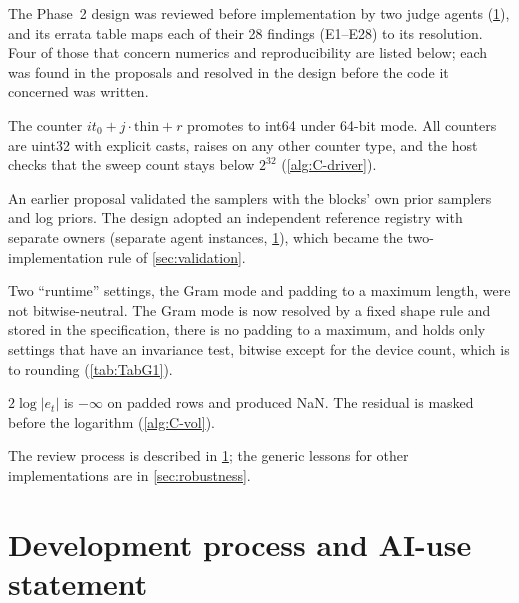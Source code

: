 The Phase~2 design was reviewed before implementation by two judge agents (\cref{app:process}),
and its errata table maps each of their 28 findings (E1--E28) to its resolution.
Four of those that concern numerics and reproducibility are listed below; each was found in the
proposals and resolved in the design before the code it concerned was written.
\begin{description}\small
\item[E7] The counter $it_0 + j\cdot\mathrm{thin} + r$ promotes to int64 under 64-bit mode. All counters are uint32 with explicit casts,  raises on any other counter type, and the host checks that the sweep count stays below $2^{32}$ (\cref{alg:C-driver}).
\item[E9] An earlier proposal validated the samplers with the blocks' own prior samplers and log priors. The design adopted an independent reference registry with separate owners (separate agent instances, \cref{app:process}), which became the two-implementation rule of \cref{sec:validation}.
\item[E14] Two ``runtime'' settings, the Gram mode and padding to a maximum length, were not bitwise-neutral. The Gram mode is now resolved by a fixed shape rule and stored in the specification, there is no padding to a maximum, and  holds only settings that have an invariance test, bitwise except for the device count, which is to rounding (\cref{tab:TabG1}).
\item[E23] $2\log|e_t|$ is $-\infty$ on padded rows and produced NaN. The residual is masked before the logarithm (\cref{alg:C-vol}).
\end{description}
The review process is described in \cref{app:process}; the generic lessons for other
implementations are in \cref{sec:robustness}.

\section{Development process and AI-use statement}\label{app:process}\label{app:disclosure}

